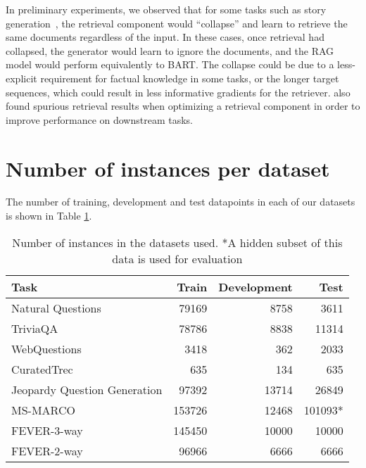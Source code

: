 \documentclass{article}
\begin{document}
In preliminary experiments, we observed that for some tasks such as story generation~\cite{fan-etal-2018-hierarchical}, the retrieval component would ``collapse'' and learn to retrieve the same documents regardless of the input. In these cases, once retrieval had collapsed, the generator would learn to ignore the documents, and the RAG model would perform equivalently to BART.
The collapse could be due to a less-explicit requirement for factual knowledge in some tasks, or the longer target sequences, which could result in less informative gradients for the retriever. \citet{perez-etal-2019-finding} also found spurious retrieval results when optimizing a retrieval component in order to improve performance on downstream tasks.



\section{Number of instances per dataset}

The number of training, development and test datapoints in each of our datasets is shown in Table \ref{tab:num_instances}.
\begin{table}

    \centering
    \small
        \caption{Number of instances in the datasets used. *A hidden subset of this data is used for evaluation }
        \vspace{5pt}
     
    \begin{tabular}{lrrr}
    \toprule
    Task & Train & Development & Test\\ \midrule
    Natural Questions & 79169 & 8758 & 3611\\
    TriviaQA & 78786 & 8838 & 11314\\
    WebQuestions & 3418 & 362 & 2033\\
    CuratedTrec & 635 & 134 & 635\\
    Jeopardy Question Generation & 97392 & 13714 & 26849\\
    MS-MARCO & 153726 & 12468 & 101093*\\
    FEVER-3-way & 145450 & 10000 & 10000\\
    FEVER-2-way & 96966 & 6666 & 6666\\

    \bottomrule
    \end{tabular}
    \label{tab:num_instances}
\end{table} 
\end{document}
